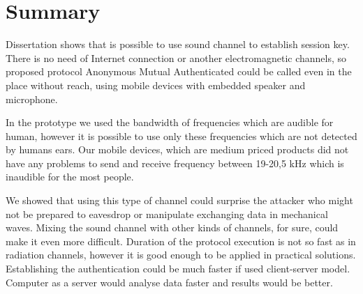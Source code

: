 \documentclass[11pt,titlepage]{article}
\theoremstyle{plain}
\begin{document}
\section{Summary}

Dissertation shows that is possible to use sound channel to establish session key. There is no need of Internet connection or another electromagnetic channels, so proposed protocol Anonymous Mutual Authenticated could be called even in the place without reach, using mobile devices with embedded speaker and microphone. 

\vspace{5mm}


In the prototype we used the bandwidth of frequencies which are audible for human, however it is possible to use only these frequencies which are not detected by humans ears. Our mobile devices, which are medium priced products did not have any problems to send and receive frequency between 19-20,5 kHz which is inaudible for the most people.

\vspace{5mm}

We showed that using this type of channel could surprise the attacker who might not be prepared to eavesdrop or manipulate exchanging data in mechanical waves. Mixing the sound channel with other kinds of channels, for sure, could make it even more difficult. Duration of the protocol execution is not so fast as in radiation channels, however it is good enough to be applied in practical solutions. Establishing the authentication could be much faster if used client-server model. Computer as a server would analyse data faster and results would be better.







\end{document}
